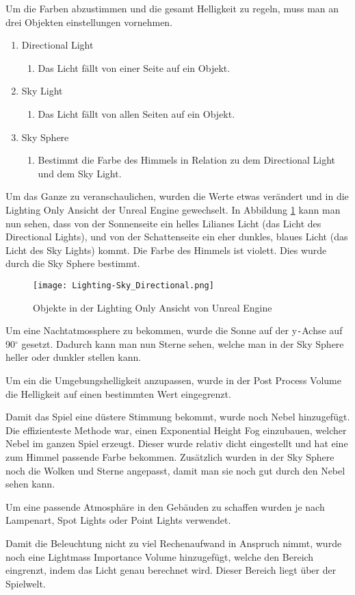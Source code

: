 Um die Farben abzustimmen und die gesamt Helligkeit zu regeln, muss man an drei Objekten einstellungen vornehmen.
\begin{enumerate}
    \item Directional Light
    \begin{enumerate}
        \item Das Licht fällt von einer Seite auf ein Objekt.
    \end{enumerate}
    \item Sky Light
    \begin{enumerate}
        \item Das Licht fällt von allen Seiten auf ein Objekt.
    \end{enumerate}
    \item Sky Sphere
    \begin{enumerate}
        \item Bestimmt die Farbe des Himmels in Relation zu dem Directional Light und dem Sky Light.
    \end{enumerate}
\end{enumerate}

Um das Ganze zu veranschaulichen, wurden die Werte etwas verändert und in die Lighting Only Ansicht der Unreal Engine gewechselt.
In Abbildung \ref{lighting:Lighting-Sky_Directional} kann man nun sehen,
dass von der Sonnenseite ein helles Lilianes Licht (das Licht des Directional Lights), und von der Schattenseite ein eher dunkles, blaues Licht
(das Licht des Sky Lights) kommt.
Die Farbe des Himmels ist violett. Dies wurde durch die Sky Sphere bestimmt.
\begin{figure}[h]
    \centering
    \texttt{[image: Lighting-Sky\_Directional.png]}
    \caption{Objekte in der Lighting Only Ansicht von Unreal Engine}
    \label{lighting:Lighting-Sky_Directional}
\end{figure}

Um eine Nachtatmossphere zu bekommen, wurde die Sonne auf der y\verb+-+Achse auf 90$^\circ$ gesetzt. Dadurch kann man nun Sterne sehen,
welche man in der Sky Sphere heller oder dunkler stellen kann.

Um ein die Umgebungshelligkeit anzupassen, wurde in der Post Process Volume die Helligkeit auf einen bestimmten Wert eingegrenzt.

Damit das Spiel eine düstere Stimmung bekommt, wurde noch Nebel hinzugefügt. Die effizienteste Methode war, einen Exponential Height Fog einzubauen, welcher
Nebel im ganzen Spiel erzeugt. Dieser wurde relativ dicht eingestellt und hat eine zum Himmel passende Farbe bekommen. Zusätzlich wurden in der Sky Sphere noch die Wolken
und Sterne angepasst, damit man sie noch gut durch den Nebel sehen kann.

Um eine passende Atmosphäre in den Gebäuden zu schaffen wurden je nach Lampenart, Spot Lights oder Point Lights verwendet.

Damit die Beleuchtung nicht zu viel Rechenaufwand in Anspruch nimmt, wurde noch eine Lightmass Importance Volume hinzugefügt, welche den Bereich eingrenzt,
indem das Licht genau berechnet wird. Dieser Bereich liegt über der Spielwelt.

